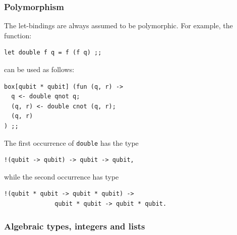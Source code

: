 \subsubsection{Polymorphism}

The let-bindings are always assumed to be polymorphic. For example, the 
function:
\begin{verbatim}
let double f q = f (f q) ;;
\end{verbatim}
can be used as follows:
\begin{verbatim}
box[qubit * qubit] (fun (q, r) ->
  q <- double qnot q;
  (q, r) <- double cnot (q, r);
  (q, r)
) ;;
\end{verbatim}
The first occurrence of \verb#double# has the type 
\begin{verbatim}
!(qubit -> qubit) -> qubit -> qubit,
\end{verbatim}
while the second occurrence has type 
\begin{verbatim}
!(qubit * qubit -> qubit * qubit) -> 
              qubit * qubit -> qubit * qubit.
\end{verbatim}

\subsubsection{Algebraic types, integers and lists}

